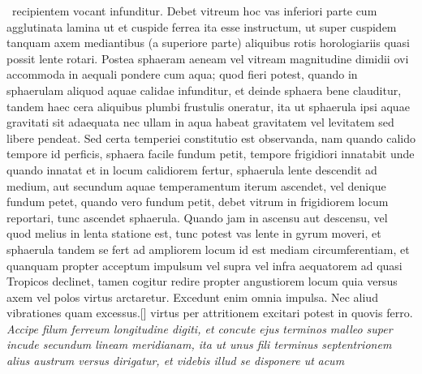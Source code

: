                       \ recipientem vocant infunditur. Debet vitreum  hoc vas inferiori parte cum agglutinata lamina  ut et cuspide ferrea ita esse instructum, ut  super cuspidem tanquam axem mediantibus  (a superiore parte) aliquibus rotis horologiariis quasi possit lente rotari. Postea sphaeram  aeneam vel vitream magnitudine dimidii ovi  accommoda in aequali pondere cum aqua; quod  fieri potest, quando in sphaerulam aliquod aquae  calidae infunditur, et deinde sphaera bene  clauditur, tandem haec cera aliquibus plumbi  frustulis oneratur, ita ut sphaerula ipsi aquae gravitati\protect{} sit adaequata nec ullam  in aqua habeat gravitatem\protect{} vel levitatem\protect{}  sed libere pendeat. Sed certa temperiei  constitutio est observanda, nam quando calido  tempore id perficis, sphaera facile fundum  petit, tempore frigidiori innatabit unde quando  innatat et in locum calidiorem fertur, sphaerula  lente descendit ad medium, aut secundum aquae  temperamentum iterum ascendet, vel denique fundum  petet, quando vero fundum petit, debet vitrum  in frigidiorem locum reportari, tunc ascendet  sphaerula. Quando jam in ascensu aut descensu, vel quod melius in lenta statione est,  tunc potest vas lente in gyrum moveri, et sphaerula tandem se fert ad ampliorem locum id  est mediam circumferentiam, et quanquam  propter acceptum impulsum vel supra vel infra aequatorem\protect{} ad quasi Tropicos\protect{} declinet, tamen cogitur redire propter angustiorem locum quia versus axem vel polos\protect{} virtus arctaretur.  Excedunt enim omnia impulsa. Nec aliud vibrationes quam excessus.\pend\clearpage \pstart {}[] virtus  per attritionem excitari potest in quovis ferro\protect{}. \textit{Accipe  filum ferreum longitudine digiti, et concute ejus  terminos malleo super incude secundum lineam  meridianam, ita ut unus fili terminus septentrionem  alius austrum versus dirigatur, et videbis illud  se disponere ut }\textit{acum}\protect{}
